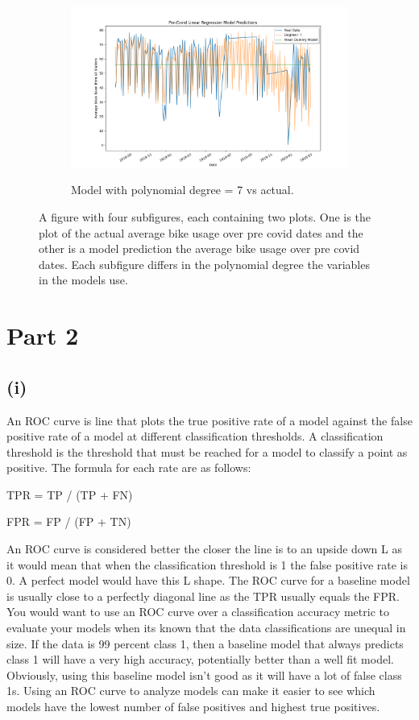 \documentclass{article}
\begin{document}
\begin{figure} [H]
\begin{subfigure}{.49\linewidth}
  \label{fig:sub3}
\end{subfigure}%
\begin{subfigure}{.49\linewidth}
  \centering
  \includegraphics[width=\linewidth, height=6cm]{featuremodel7.png}
  \caption{Model with polynomial degree = 7 vs actual.}
  \label{fig:sub3}
\end{subfigure}%
\caption{A figure with four subfigures, each containing two plots. One is the plot of the actual average bike usage over pre covid dates and the other is a model prediction the average bike usage over pre covid dates. Each subfigure differs in the polynomial degree the variables in the models use. }
\label{fig:test}
\end{figure}

\section{Part 2}
\subsection{(i)}
An ROC curve is line that plots the true positive rate of a model against the false positive rate of a model at different classification thresholds. A classification threshold is the threshold that must be reached for a model to classify a point as positive. The formula for each rate are as follows:
\begin{center}
TPR = TP / (TP + FN)

FPR = FP / (FP + TN)
\end{center}
An ROC curve is considered better the closer the line is to an upside down L as it would mean that when the classification threshold is 1 the false positive rate is 0. A perfect model would have this L shape. The ROC curve for a baseline model is usually close to a perfectly diagonal line as the TPR usually equals the FPR. You would want to use an ROC curve over a classification accuracy metric to evaluate your models when its known that the data classifications are unequal in size. If the data is 99 percent class 1, then a baseline model that always predicts class 1 will have a very high accuracy, potentially better than a well fit model. Obviously, using this baseline model isn't good as it will have a lot of false class 1s. Using an ROC curve to analyze models can make it easier to see which models have the lowest number of false positives and highest true positives.
\end{document}
